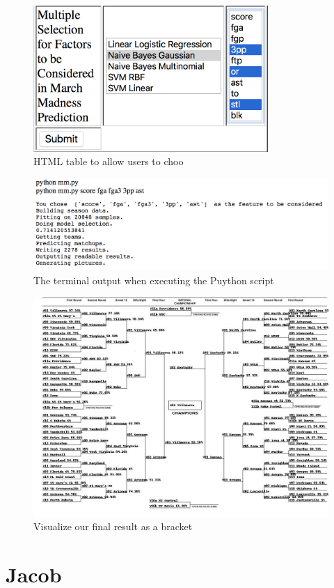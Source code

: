 \documentclass[onecolumn, draftclsnofoot,10pt, compsoc]{IEEEtran}
\begin{document}
\begin{figure}[H]
\centering
\includegraphics[width=0.8\textwidth]{images/table.png}
\caption{HTML table to allow users to choo}
\label{fig6}
\end{figure}

\begin{figure}[H]
\centering
\includegraphics[width=1\textwidth]{images/result.png}
\caption{The terminal output when executing the Puython script}
\label{fig7}
\end{figure}

\begin{figure}[H]
\centering
\includegraphics[width=1\textwidth]{images/bracket.jpg}
\caption{Visualize our final result as a bracket}
\label{fig8}
\end{figure}


\section{Jacob}
\end{document}
